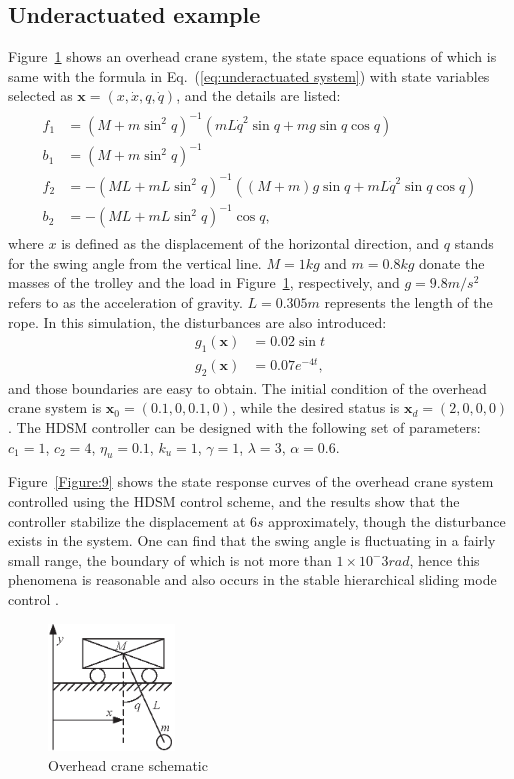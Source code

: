 \documentclass[3p]{elsarticle}
\theoremstyle{plain}
\theoremstyle{remark}
\begin{document}
\subsection{Underactuated example}
Figure~\ref{Figure:8} shows an overhead crane system, the state space equations of which is same with the formula in Eq.~(\ref{eq:underactuated system}) with state variables selected as $\bm x=(x,\dot x,q,\dot q)$, and the details are listed:
\begin{align}
\begin{split}
f_1&=(M+m\sin^2q)^{-1}(mL\dot q^2\sin q+mg\sin q\cos q)\\
b_1&=(M+m\sin^2q)^{-1}\\
f_2&=-(ML+mL\sin^2q)^{-1}((M+m)g\sin q+mL\dot q^2\sin q\cos q)\\
b_2&=-(ML+mL\sin^2q)^{-1}\cos q,
\end{split}
\end{align}
where $x$ is defined as the displacement of the horizontal direction, and $q$ stands for the swing angle from the vertical line. $M=1kg$ and $m=0.8kg$ donate the masses of the trolley and the load in Figure~\ref{Figure:8}, respectively, and $g=9.8m/s^2$ refers to as the acceleration of gravity. $L=0.305m$ represents the length of the rope. In this simulation, the disturbances are also introduced:
\begin{align}
g_1(\bm x)&= 0.02\sin t\\
g_2(\bm x)&=0.07e^{-4t},
\end{align}
and those boundaries are easy to obtain. The initial condition of the overhead crane system is $\bm x_0 = (0.1,0,0.1,0)$, while the desired status is $\bm x_d = (2,0,0,0)$. The HDSM controller can be designed with the following set of parameters:
$c_1=1$, $c_2=4$, $\eta_u = 0.1$, $k_u=1$, $\gamma = 1$, $\lambda = 3$, $\alpha = 0.6$.\par
Figure~\ref{Figure:9} shows the state response curves of the overhead crane system controlled using the HDSM control scheme, and the results show that the controller stabilize the displacement at $6s$ approximately, though the disturbance exists in the system. One can find that the swing angle is fluctuating in a fairly small range, the boundary of which is not more than $1\times 10^-3rad$, hence this phenomena is reasonable and also occurs in the stable hierarchical sliding mode control \cite{wang2004design}.
\begin{figure}
\centering
\includegraphics[width=0.3\textwidth]{paper3_fig8.eps}
\caption{Overhead crane schematic}
\label{Figure:8}
\end{figure}
\end{document}
